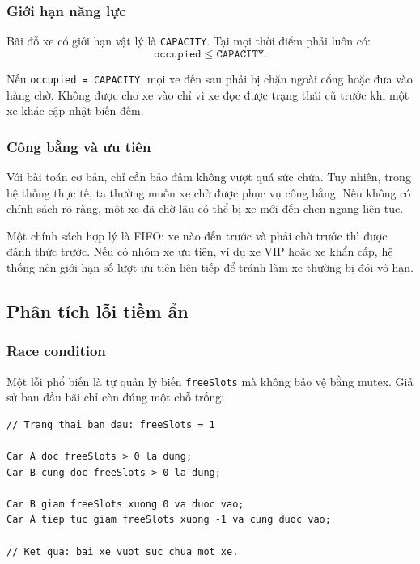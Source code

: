 \subsubsection*{Giới hạn năng lực}

Bãi đỗ xe có giới hạn vật lý là \texttt{CAPACITY}. Tại mọi thời điểm phải
luôn có:
\[
    \texttt{occupied} \leq \texttt{CAPACITY}.
\]

Nếu \texttt{occupied = CAPACITY}, mọi xe đến sau phải bị chặn ngoài cổng
hoặc đưa vào hàng chờ. Không được cho xe vào chỉ vì xe đọc được trạng thái
cũ trước khi một xe khác cập nhật biến đếm.

\subsubsection*{Công bằng và ưu tiên}

Với bài toán cơ bản, chỉ cần bảo đảm không vượt quá sức chứa. Tuy nhiên,
trong hệ thống thực tế, ta thường muốn xe chờ được phục vụ công bằng. Nếu
không có chính sách rõ ràng, một xe đã chờ lâu có thể bị xe mới đến chen
ngang liên tục.

Một chính sách hợp lý là FIFO: xe nào đến trước và phải chờ trước thì được
đánh thức trước. Nếu có nhóm xe ưu tiên, ví dụ xe VIP hoặc xe khẩn cấp, hệ
thống nên giới hạn số lượt ưu tiên liên tiếp để tránh làm xe thường bị đói
vô hạn.


\subsection{Phân tích lỗi tiềm ẩn}

\subsubsection*{Race condition}

Một lỗi phổ biến là tự quản lý biến \texttt{freeSlots} mà không bảo vệ bằng
mutex. Giả sử ban đầu bãi chỉ còn đúng một chỗ trống:

\begin{lstlisting}
// Trang thai ban dau: freeSlots = 1

Car A doc freeSlots > 0 la dung;
Car B cung doc freeSlots > 0 la dung;

Car B giam freeSlots xuong 0 va duoc vao;
Car A tiep tuc giam freeSlots xuong -1 va cung duoc vao;

// Ket qua: bai xe vuot suc chua mot xe.
\end{lstlisting}

